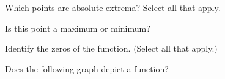 \documentclass{ximera}
\begin{document}
\begin{problem}
    Which points are absolute extrema? Select all that apply.
        \begin{selectAll}
        \end{selectAll}
    \begin{problem}
        Is this point a maximum or minimum?
        \begin{multipleChoice}
        \end{multipleChoice}
    \end{problem}
\end{problem}

\begin{problem}
    Identify the zeros of the function. (Select all that apply.)
    \begin{selectAll}
    \end{selectAll}
\end{problem}

\begin{problem}
    Does the following graph depict a function?


    \begin{multipleChoice}
    \end{multipleChoice}
\end{problem}
\end{document}

